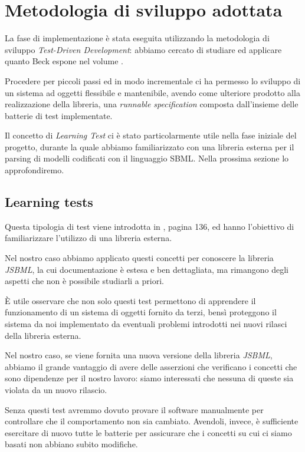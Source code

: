 \section{Metodologia di sviluppo adottata}

La fase di implementazione \`e stata eseguita utilizzando la
metodologia di sviluppo \emph{Test-Driven Development}: abbiamo
cercato di studiare ed applicare quanto Beck espone nel volume
\cite{beck2003}.

Procedere per piccoli passi ed in modo incrementale ci ha permesso lo
sviluppo di un sistema ad oggetti flessibile e mantenibile, avendo
come ulteriore prodotto alla realizzazione della libreria, una
\emph{runnable specification} composta dall'insieme delle batterie di
test implementate.

Il concetto di \emph{Learning Test} ci \`e stato particolarmente utile
nella fase iniziale del progetto, durante la quale abbiamo
familiarizzato con una libreria esterna per il parsing di modelli
codificati con il linguaggio SBML. Nella prossima sezione lo
approfondiremo.

\subsection{Learning tests}
Questa tipologia di test viene introdotta in \cite{beck2003}, pagina
136, ed hanno l'obiettivo di familiarizzare l'utilizzo di una libreria
esterna.

Nel nostro caso abbiamo applicato questi concetti per conoscere la
libreria \emph{JSBML}, la cui documentazione \`e estesa e ben
dettagliata, ma rimangono degli aspetti che non \`e possibile
studiarli a priori.

\`E utile osservare che non solo questi test permettono di apprendere
il funzionamento di un sistema di oggetti fornito da terzi, bens\`i
proteggono il sistema da noi implementato da eventuali problemi
introdotti nei nuovi rilasci della libreria esterna.

Nel nostro caso, se viene fornita una nuova versione della libreria
\emph{JSBML}, abbiamo il grande vantaggio di avere delle asserzioni
che verificano i concetti che sono dipendenze per il nostro lavoro:
siamo interessati che nessuna di queste sia violata da un nuovo
rilascio.

Senza questi test avremmo dovuto provare il software manualmente per
controllare che il comportamento non sia cambiato. Avendoli, invece,
\`e sufficiente esercitare di nuovo tutte le batterie per assicurare
che i concetti su cui ci siamo basati non abbiano subito modifiche.

